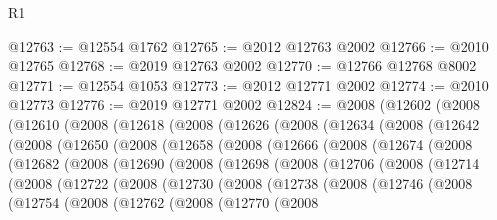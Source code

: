 \begin{lexlean}{R1}
\begin{coremodule}
@12763 := @12554 @1762
@12765 := @2012 @12763 @2002
@12766 := @2010 @12765
@12768 := @2019 @12763 @2002
@12770 := @12766 @12768 @8002
@12771 := @12554 @1053
@12773 := @2012 @12771 @2002
@12774 := @2010 @12773
@12776 := @2019 @12771 @2002
@12824 := @2008
    (@12602
      (@2008
        (@12610
          (@2008
            (@12618
              (@2008
                (@12626
                  (@2008
                    (@12634
                      (@2008
                        (@12642
                          (@2008
                            (@12650
                              (@2008
                                (@12658
                                  (@2008
                                    (@12666
                                      (@2008
                                        (@12674
                                          (@2008
                                            (@12682
                                              (@2008
                                                (@12690
                                                  (@2008
                                                    (@12698
                                                      (@2008
                                                        (@12706
                                                          (@2008
                                                            (@12714
                                                              (@2008
                                                                (@12722
                                                                  (@2008
                                                                    (@12730
                                                                      (@2008
                                                                        (@12738
                                                                          (@2008
                                                                            (@12746
                                                                              (@2008
                                                                                (@12754
                                                                                  (@2008
                                                                                    (@12762
                                                                                      (@2008
                                                                                        (@12770
                                                                                          (@2008

\end{coremodule}
\end{lexlean}
